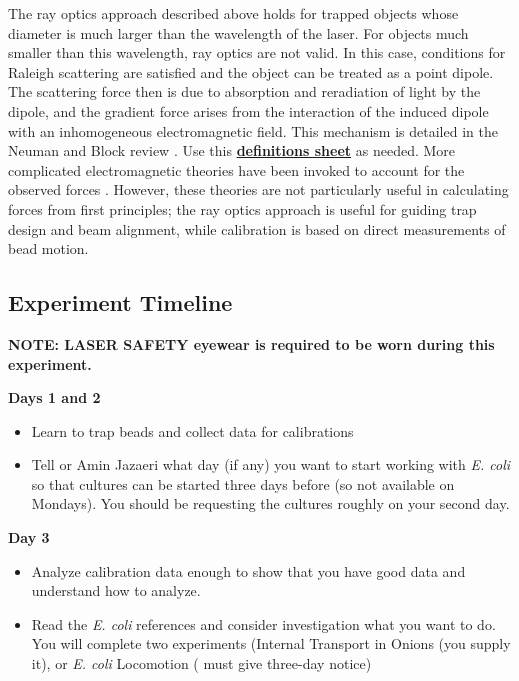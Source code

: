 \documentclass{../lab}
\begin{document}
The ray optics approach described above holds for trapped objects whose diameter is much larger than the wavelength of the laser. For objects much smaller than this wavelength, ray optics are not valid. In this case, conditions for Raleigh scattering are satisfied and the object can be treated as a point dipole. The scattering force then is due to absorption and reradiation of light by the dipole, and the gradient force arises from the interaction of the induced dipole with an inhomogeneous electromagnetic field. This mechanism is detailed in the Neuman and Block review \cite{Neuman}. Use this \href{http://physics111.lib.berkeley.edu/Physics111/Reprints/OTZ/biowikipedia.pdf}{\textbf{definitions sheet}} as needed. More complicated electromagnetic theories have been invoked to account for the observed forces \cite{Neuman,Bechhoefer,Shaevitz}. However, these theories are not particularly useful in calculating forces from first principles; the ray optics approach is useful for guiding trap design and beam alignment, while calibration is based on direct measurements of bead motion.

\subsection{Experiment Timeline}

\textbf{NOTE: LASER  SAFETY eyewear is required to be worn during this experiment.}

\textbf{Days 1 and 2}

\begin{itemize}
    \item Learn to trap beads and collect data for calibrations

    \item Tell \LabEngineer or Amin Jazaeri what day (if any) you want to start working with \emph{E. coli} so that cultures can be started three days before (so not available on Mondays). You should be requesting the cultures roughly on your second day.
\end{itemize}

\textbf{Day 3}

\begin{itemize}
    \item Analyze calibration data enough to show that you have good data and understand how to analyze.

    \item Read the \emph{E. coli}  references and consider investigation what you want to do. You will complete two experiments (Internal Transport in Onions (you supply it), or \emph{E. coli} Locomotion ( must give three-day notice)
\end{itemize}
\end{document}
